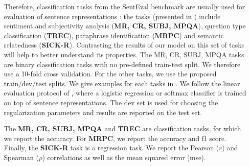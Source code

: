 Therefore, classification tasks from the SentEval benchmark are usually used for evaluation of sentence representations \parencite{conneau_18}: the tasks (presented in ) include sentiment and subjectivity analysis (\textbf{MR, CR, SUBJ, MPQA}), question type classification (\textbf{TREC}), paraphrase identification (\textbf{MRPC}) and semantic relatedness (\textbf{SICK-R}). Contrasting the results of our model on this set of tasks will help to better understand its properties. The MR, CR, SUBJ, MPQA tasks are binary classification tasks with no pre-defined train-test split. We therefore use a 10-fold cross validation. For the other tasks, we use the proposed train/dev/test splits. We give examples for each tasks in .
We follow the linear evaluation protocol of \textcite{kiros_15}, where a logistic regression or softmax classifier is trained on top of sentence representations. The dev set is used for choosing the regularization parameters and results are reported on the test set. 

The \textbf{MR, CR, SUBJ, MPQA} and \textbf{TREC} are classification tasks, for which we report the accuracy. For \textbf{MRPC}, we report the accuracy and f1 score. Finally, the \textbf{SICK-R} task is a regression task. We report the Pearson ($r$) and Spearman ($\rho$) correlations as well as the mean squared error (mse).


